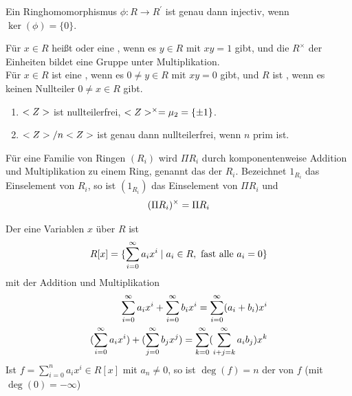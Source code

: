 \begin{proposition}
	Ein Ringhomomorphismus $\phi: R \to R^{'}$ ist genau dann injectiv, wenn $\ker(\phi) =\{0\}$.
\end{proposition}

\begin{definition}
	Für $x \in R$ heißt  oder eine , wenn es $y\in R$ mit $xy=1$ gibt, und die $R^{\times}$ der Einheiten bildet eine Gruppe unter Multiplikation.\\
	Für $x \in R$ ist eine , wenn es $0 \neq y \in R$ mit $xy=0$ gibt, und $R$ ist , wenn es keinen Nullteiler $0\neq x \in R$ gibt.
\end{definition}

\begin{example}
	\begin{enumerate}
		\item $<Z>$ ist nullteilerfrei, $<Z>^{\times} = \mu_2 = \{ \pm 1 \}$.
		\item $<Z> / n <Z>$ ist genau dann nullteilerfrei, wenn $n$ prim ist.
	\end{enumerate}
\end{example}

\begin{example}
	Für eine Familie von Ringen $(R_i)$ wird $\Pi R_i$ durch komponentenweise Addition und Multiplikation zu einem Ring, genannt das  der $R_i$. Bezeichnet $1_{R_i}$ das Einselement von $R_i$, so ist $(1_{R_i})$ das Einselement von $\Pi R_i$ und 
	\begin{align}
		(\Pi R_i)^{\times} = \Pi R_i \notag
	\end{align}
\end{example}

\begin{example}
	Der  eine Variablen $x$ über $R$ ist 
	\begin{align}
		R[x] = \{ \sum_{i=0}^{\infty} a_i x^i \mid a_i \in R, \text{ fast alle } a_i = 0\} \notag
	\end{align}
	mit der Addition und Multiplikation
	\begin{align}
		\sum_{i=0}^{\infty} a_i x^i + \sum_{i=0}^{\infty} b_i x^i = \sum_{i=0}^{\infty} (a_i + b_i) x^i \notag \\
		(\sum_{i=0}^{\infty} a_i x^i) + (\sum_{j=0}^{\infty} b_j x^j) = \sum_{k=0}^{\infty} (\sum_{i+j=k}^{\infty} a_i b_j) x^k \notag
	\end{align}
	Ist $f = \sum_{i=0}^n a_i x^i \in R[x]$ mit $a_n \neq 0$, so ist $\deg(f) = n$ der  von $f$ (mit $\deg(0) = -\infty$)
\end{example}